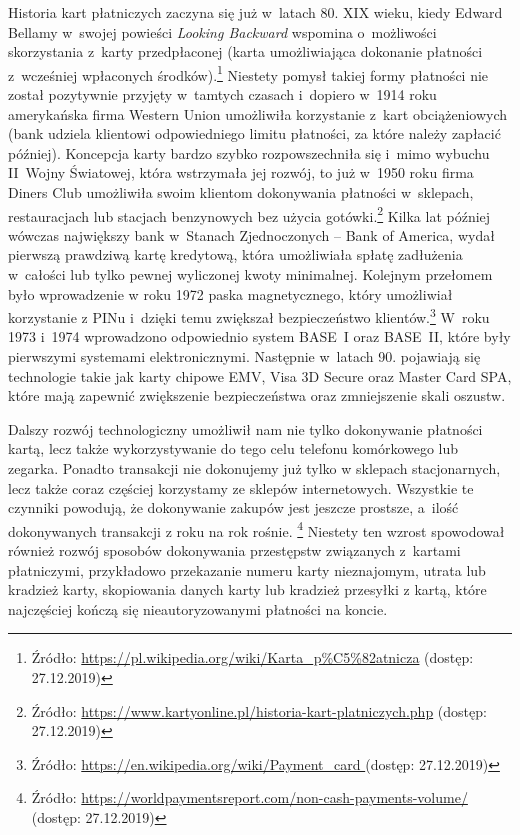 \documentclass[inzynierska]{pwr_wmat_praca_dyplomowa}
\theoremstyle{plain}
\numberwithin{theorem}{chapter}
\theoremstyle{definition}
\numberwithin{theorem}{chapter}
\begin{document}
Historia kart płatniczych zaczyna się już w~latach 80. XIX wieku, kiedy Edward Bellamy w~swojej powieści \textit{Looking Backward} wspomina o~możliwości skorzystania z~karty przedpłaconej (karta umożliwiająca dokonanie płatności z~wcześniej wpłaconych środków).\footnote{Źródło: \url{https://pl.wikipedia.org/wiki/Karta_p\%C5\%82atnicza} (dostęp: 27.12.2019)} Niestety pomysł takiej formy płatności nie został pozytywnie przyjęty w~tamtych czasach i~dopiero w~1914 roku amerykańska firma Western Union umożliwiła korzystanie z~kart obciążeniowych (bank udziela klientowi odpowiedniego limitu płatności, za które należy zapłacić później). Koncepcja karty bardzo szybko rozpowszechniła się i~mimo wybuchu II~Wojny Światowej, która wstrzymała jej rozwój, to już w~1950 roku firma Diners Club umożliwiła swoim klientom dokonywania płatności w~sklepach, restauracjach lub stacjach benzynowych bez użycia gotówki.\footnote{Źródło: \url{https://www.kartyonline.pl/historia-kart-platniczych.php} (dostęp: 27.12.2019)} Kilka lat później wówczas największy bank w~Stanach Zjednoczonych -- Bank of America, wydał pierwszą prawdziwą kartę kredytową, która umożliwiała spłatę zadłużenia w~całości lub tylko pewnej wyliczonej kwoty minimalnej. Kolejnym przełomem było wprowadzenie w roku 1972 paska magnetycznego, który umożliwiał korzystanie z PINu i~dzięki temu zwiększał bezpieczeństwo klientów.\footnote{Źródło: \url{https://en.wikipedia.org/wiki/Payment_card } (dostęp: 27.12.2019)} W~roku 1973 i~1974 wprowadzono odpowiednio system BASE~I oraz BASE~II, które były pierwszymi systemami elektronicznymi. Następnie w~latach 90. pojawiają się technologie takie jak karty chipowe EMV, Visa 3D Secure oraz Master Card SPA, które mają zapewnić zwiększenie bezpieczeństwa oraz zmniejszenie skali oszustw.

Dalszy rozwój technologiczny umożliwił nam nie tylko dokonywanie płatności kartą, lecz także wykorzystywanie do tego celu telefonu komórkowego lub zegarka. Ponadto transakcji nie dokonujemy już tylko w sklepach stacjonarnych, lecz także coraz częściej korzystamy ze sklepów internetowych. Wszystkie te czynniki powodują, że dokonywanie zakupów jest jeszcze prostsze, a~ilość dokonywanych transakcji z roku na rok rośnie. \footnote{Źródło: \url{https://worldpaymentsreport.com/non-cash-payments-volume/} (dostęp: 27.12.2019)} Niestety ten wzrost spowodował również rozwój sposobów dokonywania przestępstw związanych z~kartami płatniczymi, przykładowo przekazanie numeru karty nieznajomym, utrata lub kradzież karty, skopiowania danych karty lub kradzież przesyłki z kartą, które najczęściej kończą się nieautoryzowanymi płatności na koncie.
\end{document}
